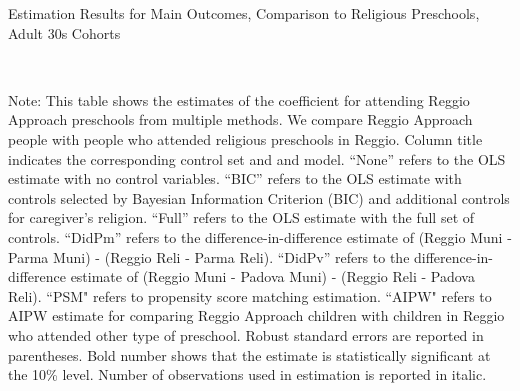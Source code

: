 \begin{table}[H] \caption{Estimation Results for Main Outcomes, Comparison to Religious Preschools, Adult 30s Cohorts} \label{ols-M-adult30-reg-reli}
\scalebox{0.75}{}
\vspace{1ex} \\
\footnotesize\raggedright{Note: This table shows the estimates of the coefficient for attending Reggio Approach preschools from multiple methods. We compare Reggio Approach people with people who attended religious preschools in Reggio. Column title indicates the corresponding control set and and model. ``None'' refers to the OLS estimate with no control variables. ``BIC'' refers to the OLS estimate with controls selected by Bayesian Information Criterion (BIC) and additional controls for caregiver's religion. ``Full'' refers to the OLS estimate with the full set of controls. ``DidPm'' refers to the difference-in-difference estimate of (Reggio Muni - Parma Muni) - (Reggio Reli - Parma Reli). ``DidPv'' refers to the difference-in-difference estimate of (Reggio Muni - Padova Muni) - (Reggio Reli - Padova Reli). ``PSM" refers to propensity score matching estimation. ``AIPW" refers to AIPW estimate for comparing Reggio Approach children with children in Reggio who attended other type of preschool. Robust standard errors are reported in parentheses. Bold number shows that the estimate is statistically significant at the 10\% level. Number of observations used in estimation is reported in italic.}
\end{table}


